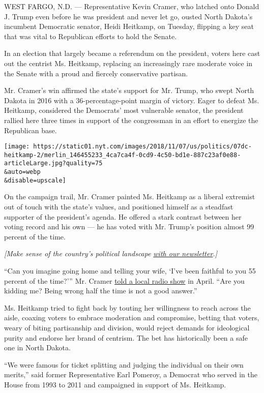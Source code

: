 WEST FARGO, N.D. --- Representative Kevin Cramer, who latched onto
Donald J. Trump even before he was president and never let go, ousted
North Dakota's incumbent Democratic senator, Heidi Heitkamp, on Tuesday,
flipping a key seat that was vital to Republican efforts to hold the
Senate.

In an election that largely became a referendum on the president, voters
here cast out the centrist Ms. Heitkamp, replacing an increasingly rare
moderate voice in the Senate with a proud and fiercely conservative
partisan.

Mr. Cramer's win affirmed the state's support for Mr. Trump, who swept
North Dakota in 2016 with a 36-percentage-point margin of victory. Eager
to defeat Ms. Heitkamp, considered the Democrats' most vulnerable
senator, the president rallied here three times in support of the
congressman in an effort to energize the Republican base.

\texttt{[image: https://static01.nyt.com/images/2018/11/07/us/politics/07dc-heitkamp-2/merlin\_146455233\_4ca7ca4f-0cd9-4c50-bd1e-887c23af0e88-articleLarge.jpg?quality=75\\\&auto=webp\\\&disable=upscale]}

On the campaign trail, Mr. Cramer painted Ms. Heitkamp as a liberal
extremist out of touch with the state's values, and positioned himself
as a steadfast supporter of the president's agenda. He offered a stark
contrast between her voting record and his own --- he has voted with Mr.
Trump's position almost 99 percent of the time.

\emph{{[}Make sense of the country's political landscape}
\emph{\href{https://www.nytimes.com/newsletters/politics?smid=rd\%3Faction\%3Dclick\&module=inline\&pgtype=Article}{with
our newsletter}.{]}}

``Can you imagine going home and telling your wife, `I've been faithful
to you 55 percent of the time?''' Mr. Cramer
\href{https://www.cnn.com/2018/04/04/politics/kevin-cramer-faithful-cheating/index.html}{told
a local radio show} in April. ``Are you kidding me? Being wrong half the
time is not a good answer.''

Ms. Heitkamp tried to fight back by touting her willingness to reach
across the aisle, coaxing voters to embrace moderation and compromise,
betting that voters, weary of biting partisanship and division, would
reject demands for ideological purity and endorse her brand of centrism.
The bet has historically been a safe one in North Dakota.

``We were famous for ticket splitting and judging the individual on
their own merits,'' said former Representative Earl Pomeroy, a Democrat
who served in the House from 1993 to 2011 and campaigned in support of
Ms. Heitkamp.

